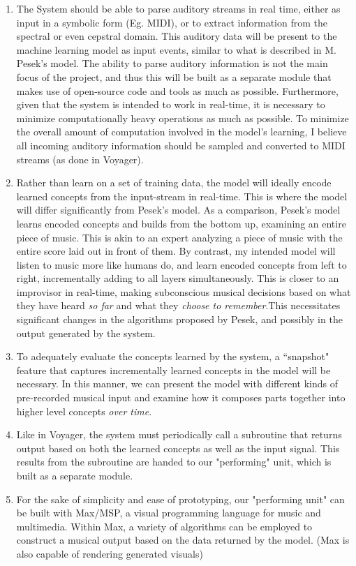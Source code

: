 \documentclass[../main.tex]{subfiles}
\begin{document}
\begin{enumerate}
    \item The System should be able to parse auditory streams in real time, either as input in a symbolic form (Eg. MIDI), or to extract information from the spectral or even cepstral domain. This auditory data will be present to the machine learning model as input events, similar to what is described in M. Pesek's model. The ability to parse auditory information is not the main focus of the project, and thus this will be built as a separate module that makes use of open-source code and tools as much as possible. Furthermore, given that the system is intended to work in real-time, it is necessary to minimize computationally heavy operations as much as possible.  To minimize the overall amount of computation involved in the model's learning, I believe all incoming auditory information should be sampled and converted to MIDI streams (as done in Voyager).
    
    \item Rather than learn on a set of training data, the model will ideally encode learned concepts from the input-stream in real-time. This is where the model will differ significantly from Pesek's model. As a comparison, Pesek's model learns encoded concepts and builds from the bottom up, examining an entire piece of music. This is akin to an expert analyzing a piece of music with the entire score laid out in front of them. By contrast, my intended model will listen to music more like humans do, and learn encoded concepts from left to right, incrementally adding to all layers simultaneously. This is closer to an improvisor in real-time, making subconscious musical decisions based on what they have heard \textit{so far} and what they \textit{choose to remember}.This necessitates significant changes in the algorithms proposed by Pesek, and possibly in the output generated by the system.

    \item To adequately evaluate the concepts learned by the system, a ``snapshot" feature that captures incrementally learned concepts in the model will be necessary. In this manner, we can present the model with different kinds of pre-recorded musical input and examine how it composes parts together into higher level concepts \textit{over time}.

    \item Like in Voyager, the system must periodically call a subroutine that returns output based on both the learned concepts as well as the input signal. This results from the subroutine are handed to our "performing" unit, which is built as a separate module. 

    \item For the sake of simplicity and ease of prototyping, our "performing unit" can be built with Max/MSP, a visual programming language for music and multimedia. Within Max, a variety of algorithms can be employed to construct a musical output based on the data returned by the model. (Max is also capable of rendering generated visuals)
\end{enumerate}
\end{document}

